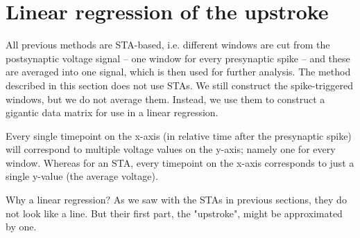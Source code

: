 \section{Linear regression of the upstroke}

All previous methods are STA-based, i.e. different windows are cut from the postsynaptic voltage signal -- one window for every presynaptic spike -- and these are averaged into one signal, which is then used for further analysis. The method described in this section does not use STAs. We still construct the spike-triggered windows, but we do not average them. Instead, we use them to construct a gigantic data matrix for use in a linear regression.

Every single timepoint on the x-axis (in relative time after the presynaptic spike) will correspond to multiple voltage values on the y-axis; namely one for every window. Whereas for an STA, every timepoint on the x-axis corresponds to just a single y-value (the average voltage).

Why a linear regression? As we saw with the STAs in previous sections, they do not look like a line. But their first part, the "upstroke", might be approximated by one.

